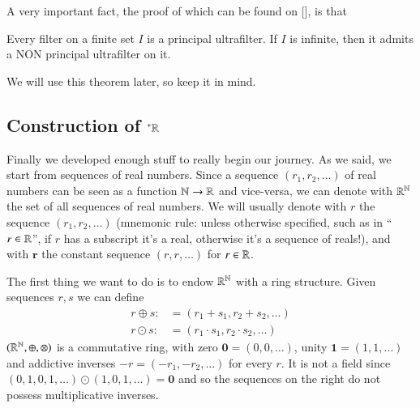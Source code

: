 \documentclass[adraft, copyright,creativecommons,sharealike,noncommercial]{Preambles/eptcs}
\newcommand{\nstar}{{^*}}
\begin{document}
A very important fact, the proof of which can be found on [], is that
\begin{theorem}\label{thm:nonprincipalexists}
	Every filter on a finite set $I$ is a principal ultrafilter. If $I$ is infinite, then it admits a NON principal ultrafilter on it.
\end{theorem}
We will use this theorem later, so keep it in mind.

\subsection{Construction of $\nstar \reals$}
Finally we developed enough stuff to really begin our journey. As we said, we start from sequences of real numbers.
Since a sequence $(r_1, r_2, \dots)$ of real numbers can be seen as a function $\mathbb{N} \to \mathbb{R}$ and vice-versa, we can denote with $\mathbb{R}^{\mathbb{N}}$ the set of all sequences of real numbers. We will usually denote with $r$ the sequence $(r_1, r_2, \dots)$ (mnemonic rule: unless otherwise specified, such as in ``$r \in \mathbb{R}$'', if $r$ has a subscript it's a real, otherwise it's a sequence of reals!), and with $\mathbf{r}$ the constant sequence $(r,r,\dots)$ for $r \in \mathbb{R}$.

The first thing we want to do is to endow $\mathbb{R}^{\mathbb{N}}$ with a ring structure. Given sequences $r,s$ we can define
\begin{align*}
	r \oplus s :&= (r_1 + s_1, r_2 + s_2, \dots)\\
	r \odot s :&= (r_1\cdot s_1, r_2 \cdot s_2, \dots) 
\end{align*}
$(\mathbb{R}^{\mathbb{N}}, \oplus, \otimes)$ is a commutative ring, with zero $\mathbf{0} = (0,0,\dots)$, unity $\mathbf{1} = (1,1, \dots)$ and addictive inverses $-r = (-r_1, -r_2, \dots)$ for every $r$. It is not a field since $(0,1,0,1,\dots) \odot (1,0,1,\dots) = \mathbf{0}$
and so the sequences on the right do not possess multiplicative inverses.
\end{document}
